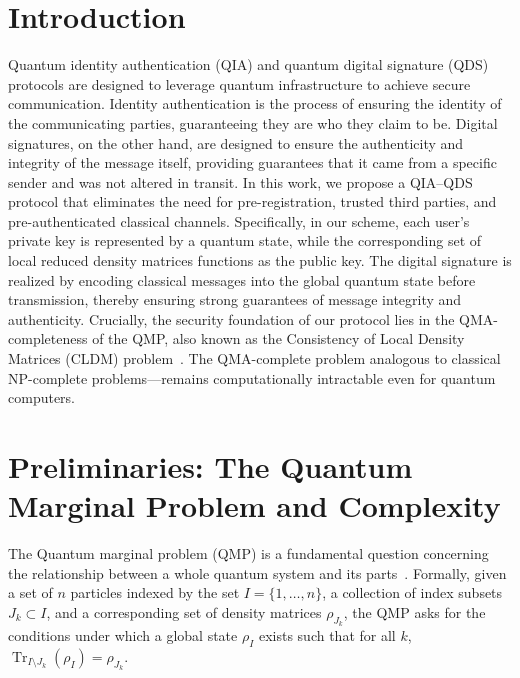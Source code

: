 \documentclass[a0,portrait]{a0poster}
\theoremstyle{definition}
\begin{document}
\begin{multicols}{2}
\section*{Introduction}
Quantum identity authentication (QIA) and quantum digital signature (QDS) protocols are designed to leverage quantum infrastructure to achieve secure communication. Identity authentication is the process of ensuring the identity of the communicating parties, guaranteeing they are who they claim to be. Digital signatures, on the other hand, are designed to ensure the authenticity and integrity of the message itself, providing guarantees that it came from a specific sender and was not altered in transit. 
In this work, we propose a QIA–QDS protocol that eliminates the need for pre-registration, trusted third parties, and pre-authenticated classical channels.
Specifically, in our scheme, each user’s private key is represented by a quantum state, while the corresponding set of local reduced density matrices functions as the public key. The digital signature is realized by encoding classical messages into the global quantum state before transmission, thereby ensuring strong guarantees of message integrity and authenticity. Crucially, the security foundation of our protocol lies in the QMA-completeness of the QMP, also known as the Consistency of Local Density Matrices (CLDM) problem~\cite{liu2006}. The QMA-complete problem analogous to classical NP-complete problems—remains computationally intractable even for quantum computers.


\color{Black} %

\section*{Preliminaries: The Quantum Marginal Problem and Complexity}

The Quantum marginal problem (QMP) is a fundamental question concerning the relationship between a whole quantum system and its parts~\cite{schilling2014quantum}. Formally, given a set of $n$ particles indexed by the set $I=\{1,\ldots ,n\}$, a collection of index subsets $J_k\subset I$, and a corresponding set of density matrices $\rho_{J_k}$, the QMP asks for the conditions under which a global state $\rho_I$ exists such that for all $k$, $\operatorname{Tr}_{I\setminus J_k}(\rho_I)=\rho_{J_k}$.


\end{multicols}
\end{document}
